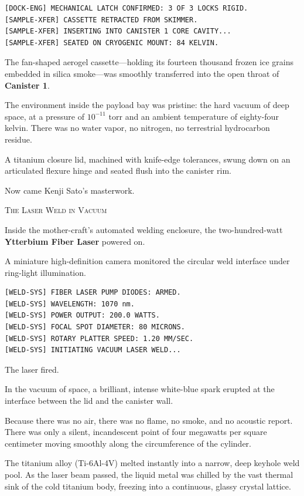 \documentclass[12pt,twoside,openright]{book}
\newcommand{\sceneheader}[1]{%
  \par\vspace{1.8em}%
  {\noindent\centering\scshape\large #1\par}%
  \vspace{1.0em}%
  \noindent%
}
\newcommand{\dinkus}{%
  \par\vspace{1.2em}%
  {\noindent\centering{\large $\ast\quad\ast\quad\ast$}\par}%
  \vspace{1.2em}%
  \noindent%
}
\begin{document}
\begin{lstlisting}
[DOCK-ENG] MECHANICAL LATCH CONFIRMED: 3 OF 3 LOCKS RIGID.
[SAMPLE-XFER] CASSETTE RETRACTED FROM SKIMMER.
[SAMPLE-XFER] INSERTING INTO CANISTER 1 CORE CAVITY...
[SAMPLE-XFER] SEATED ON CRYOGENIC MOUNT: 84 KELVIN.
\end{lstlisting}

The fan-shaped aerogel cassette---holding its fourteen thousand frozen
ice grains embedded in silica smoke---was smoothly transferred into the
open throat of \textbf{Canister 1}.

The environment inside the payload bay was pristine: the hard vacuum of
deep space, at a pressure of \(10^{-11}\text{ torr}\) and an ambient
temperature of eighty-four kelvin. There was no water vapor, no
nitrogen, no terrestrial hydrocarbon residue.

A titanium closure lid, machined with knife-edge tolerances, swung down
on an articulated flexure hinge and seated flush into the canister rim.

Now came Kenji Sato's masterwork.

\dinkus

\sceneheader{The Laser Weld in Vacuum}

Inside the mother-craft's automated welding enclosure, the
two-hundred-watt \textbf{Ytterbium Fiber Laser} powered on.

A miniature high-definition camera monitored the circular weld interface
under ring-light illumination.

\begin{lstlisting}
[WELD-SYS] FIBER LASER PUMP DIODES: ARMED.
[WELD-SYS] WAVELENGTH: 1070 nm.
[WELD-SYS] POWER OUTPUT: 200.0 WATTS.
[WELD-SYS] FOCAL SPOT DIAMETER: 80 MICRONS.
[WELD-SYS] ROTARY PLATTER SPEED: 1.20 MM/SEC.
[WELD-SYS] INITIATING VACUUM LASER WELD...
\end{lstlisting}

The laser fired.

In the vacuum of space, a brilliant, intense white-blue spark erupted at
the interface between the lid and the canister wall.

Because there was no air, there was no flame, no smoke, and no acoustic
report. There was only a silent, incandescent point of four megawatts
per square centimeter moving smoothly along the circumference of the
cylinder.

The titanium alloy (Ti-6Al-4V) melted instantly into a narrow, deep
keyhole weld pool. As the laser beam passed, the liquid metal was
chilled by the vast thermal sink of the cold titanium body, freezing
into a continuous, glassy crystal lattice.
\end{document}
